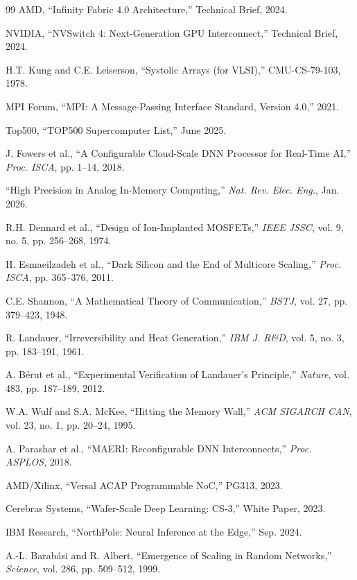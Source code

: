 ﻿\documentclass[review,3p,twocolumn]{elsarticle}
\begin{document}
\begin{thebibliography}{99}
 AMD, ``Infinity Fabric 4.0 Architecture,'' Technical Brief, 2024.

 NVIDIA, ``NVSwitch 4: Next-Generation GPU Interconnect,'' Technical Brief, 2024.

 H.T. Kung and C.E. Leiserson, ``Systolic Arrays (for VLSI),'' CMU-CS-79-103, 1978.

 MPI Forum, ``MPI: A Message-Passing Interface Standard, Version 4.0,'' 2021.

 Top500, ``TOP500 Supercomputer List,'' June 2025.

 J. Fowers et al., ``A Configurable Cloud-Scale DNN Processor for Real-Time AI,'' \emph{Proc. ISCA}, pp. 1--14, 2018.

 ``High Precision in Analog In-Memory Computing,'' \emph{Nat. Rev. Elec. Eng.}, Jan. 2026.

 R.H. Dennard et al., ``Design of Ion-Implanted MOSFETs,'' \emph{IEEE JSSC}, vol. 9, no. 5, pp. 256--268, 1974.

 H. Esmaeilzadeh et al., ``Dark Silicon and the End of Multicore Scaling,'' \emph{Proc. ISCA}, pp. 365--376, 2011.

 C.E. Shannon, ``A Mathematical Theory of Communication,'' \emph{BSTJ}, vol. 27, pp. 379--423, 1948.

 R. Landauer, ``Irreversibility and Heat Generation,'' \emph{IBM J. R\&D}, vol. 5, no. 3, pp. 183--191, 1961.

 A. B\'{e}rut et al., ``Experimental Verification of Landauer's Principle,'' \emph{Nature}, vol. 483, pp. 187--189, 2012.

 W.A. Wulf and S.A. McKee, ``Hitting the Memory Wall,'' \emph{ACM SIGARCH CAN}, vol. 23, no. 1, pp. 20--24, 1995.

 A. Parashar et al., ``MAERI: Reconfigurable DNN Interconnects,'' \emph{Proc. ASPLOS}, 2018.

 AMD/Xilinx, ``Versal ACAP Programmable NoC,'' PG313, 2023.

 Cerebras Systems, ``Wafer-Scale Deep Learning: CS-3,'' White Paper, 2023.

 IBM Research, ``NorthPole: Neural Inference at the Edge,'' Sep. 2024.

 A.-L. Barab\'{a}si and R. Albert, ``Emergence of Scaling in Random Networks,'' \emph{Science}, vol. 286, pp. 509--512, 1999.


\end{thebibliography}
\end{document}
